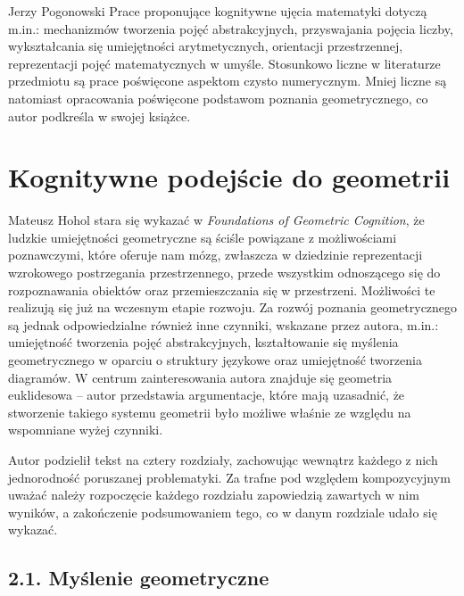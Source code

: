 \begin{newrevengenv}{Jerzy Pogonowski}
Prace proponujące kognitywne ujęcia matematyki dotyczą m.in.:
mechanizmów tworzenia pojęć abstrakcyjnych, przyswajania pojęcia
liczby, wykształcania się umiejętności arytmetycznych, orientacji
przestrzennej, reprezentacji pojęć matematycznych w umyśle. Stosunkowo
liczne w literaturze przedmiotu są prace poświęcone aspektom
czysto numerycznym. Mniej liczne są natomiast opracowania
poświęcone podstawom poznania geometrycznego, co autor podkreśla w
swojej książce.

\section{Kognitywne podejście do geometrii}

Mateusz Hohol stara się wykazać w {\em Foundations of Geometric
Cognition}, że ludzkie umiejętności geometryczne są ściśle
powiązane z możliwościami poznawczymi, które oferuje nam mózg,
zwłaszcza w dziedzinie reprezentacji wzrokowego postrzegania
przestrzennego, przede wszystkim odnoszącego się do rozpoznawania
obiektów oraz przemieszczania się w przestrzeni. Możliwości te
realizują się już na wczesnym etapie rozwoju. Za rozwój poznania
geometrycznego są jednak odpowiedzialne również inne czynniki,
wskazane przez autora, m.in.: umiejętność tworzenia pojęć
abstrakcyjnych, kształtowanie się myślenia geometrycznego w
oparciu o struktury językowe oraz umiejętność tworzenia diagramów.
W centrum zainteresowania autora znajduje się geometria
euklidesowa -- autor przedstawia argumentacje, które mają
uzasadnić, że stworzenie takiego systemu geometrii było możliwe
właśnie ze względu na wspomniane wyżej czynniki.

Autor podzielił tekst na cztery rozdziały, zachowując wewnątrz
każdego z nich jednorodność poruszanej problematyki. Za trafne pod
względem kompozycyjnym uważać należy rozpoczęcie każdego rozdziału
zapowiedzią zawartych w nim wyników, a zakończenie podsumowaniem
tego, co w danym rozdziale udało się wykazać.

\subsection{2.1. Myślenie geometryczne}


\end{newrevengenv}
